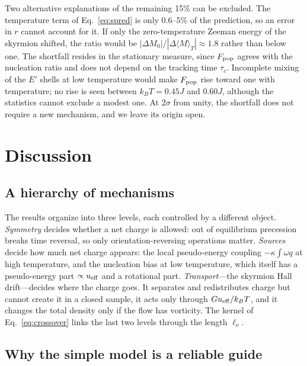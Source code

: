 \documentclass[aps,prb,twocolumn,superscriptaddress,longbibliography,floatfix]{revtex4-2}
\newcommand{\ueff}{u_{\rm eff}}
\newcommand{\kT}{k_BT}
\newcommand{\avg}[1]{\langle #1\rangle}
\begin{document}
Two alternative explanations of the remaining 15\% can be excluded. The temperature term of Eq.~\eqref{eq:spred} is only 0.6--5\% of the prediction, so an error in $r$ cannot account for it. If only the zero-temperature Zeeman energy of the skyrmion shifted, the ratio would be $|\Delta M_0|/|\Delta\avg{M}_T|\approx1.8$ rather than below one. The shortfall resides in the stationary measure, since $F_{\rm pop}$ agrees with the nucleation ratio and does not depend on the tracking time $\tau_c$. Incomplete mixing of the $E'$ shells at low temperature would make $F_{\rm pop}$ rise toward one with temperature; no rise is seen between $\kT=0.45J$ and $0.60J$, although the statistics cannot exclude a modest one. At $2\sigma$ from unity, the shortfall does not require a new mechanism, and we leave its origin open.

\section{Discussion}\label{sec:discussion}

\subsection{A hierarchy of mechanisms}

The results organize into three levels, each controlled by a different object. \emph{Symmetry} decides whether a net charge is allowed: out of equilibrium precession breaks time reversal, so only orientation-reversing operations matter. \emph{Sources} decide how much net charge appears: the local pseudo-energy coupling $-\kappa\int\omega q$ at high temperature, and the nucleation bias at low temperature, which itself has a pseudo-energy part $\propto\ueff$ and a rotational part. \emph{Transport}---the skyrmion Hall drift---decides where the charge goes. It separates and redistributes charge but cannot create it in a closed sample, it acts only through $G\ueff/\kT$, and it changes the total density only if the flow has vorticity. The kernel of Eq.~\eqref{eq:crossover} links the last two levels through the length $\ell_\nu$.

\subsection{Why the simple model is a reliable guide}
\end{document}

